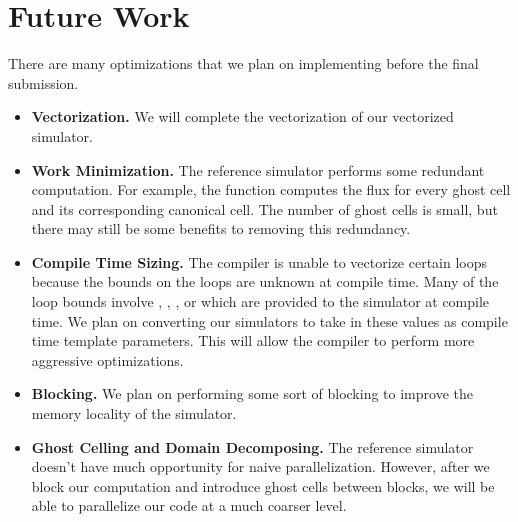 \section{Future Work}\label{sec:future}
There are many optimizations that we plan on implementing before the final
submission.

\begin{itemize}
  \item \textbf{Vectorization.}
    We will complete the vectorization of our vectorized simulator.

  \item \textbf{Work Minimization.}
    The reference simulator performs some redundant computation. For example,
    the function  computes the flux for every ghost
    cell and its corresponding canonical cell. The number of ghost cells is
    small, but there may still be some benefits to removing this redundancy.

  \item \textbf{Compile Time Sizing.}
    The compiler is unable to vectorize certain loops because the bounds on the
    loops are unknown at compile time. Many of the loop bounds involve
    , , , or  which are provided to
    the simulator at compile time. We plan on converting our simulators to take
    in these values as compile time template parameters. This will allow the
    compiler to perform more aggressive optimizations.

  \item \textbf{Blocking.}
    We plan on performing some sort of blocking to improve the memory locality
    of the simulator.

  \item \textbf{Ghost Celling and Domain Decomposing.}
    The reference simulator doesn't have much opportunity for naive
    parallelization. However, after we block our computation and introduce
    ghost cells between blocks, we will be able to parallelize our code at a
    much coarser level.
\end{itemize}
